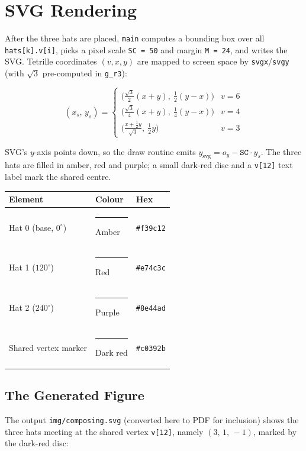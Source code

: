 \documentclass[10pt,a4paper]{article}
\let\polysection\section
\renewcommand\section{\needspace{0.16\textheight}\polysection}
\let\polysubsection\subsection
\renewcommand\subsection{\needspace{0.12\textheight}\polysubsection}
\newcommand{\code}[1]{\texttt{\small #1}}
\newcommand{\file}[1]{\texttt{\footnotesize #1}}
\newcommand{\vcoord}[3]{$(#1,\,#2,\,#3)$}
\begin{document}
\section{SVG Rendering}

After the three hats are placed, \code{main} computes a bounding box over all
\code{hats[k].v[i]}, picks a pixel scale \code{SC = 50} and margin
\code{M = 24}, and writes the SVG.  Tetrille coordinates $(v,x,y)$ are mapped
to screen space by \code{svgx}/\code{svgy} (with $\sqrt 3$ pre-computed in
\code{g\_r3}):

\[
  (x_s,\,y_s) =
  \begin{cases}
    \bigl(\tfrac{\sqrt3}{2}(x+y),\ \tfrac12(y-x)\bigr) & v = 6 \\[3pt]
    \bigl(\tfrac{\sqrt3}{4}(x+y),\ \tfrac14(y-x)\bigr) & v = 4 \\[3pt]
    \bigl(\tfrac{x+\frac12 y}{\sqrt3},\ \tfrac12 y\bigr) & v = 3
  \end{cases}
\]

\noindent SVG's $y$-axis points down, so the draw routine emits
$y_{\text{svg}} = o_y - \texttt{SC}\cdot y_s$.  The three hats are filled in
amber, red and purple; a small dark-red disc and a \code{v[12]} text label
mark the shared centre.

\begin{center}
\begin{tabular}{@{}lll@{}}
\toprule
\textbf{Element} & \textbf{Colour} & \textbf{Hex} \\
\midrule
Hat 0 (base, $0^\circ$)   & {\color{seedorange}\rule{1em}{0.8em}} Amber  & \texttt{\#f39c12} \\
Hat 1 ($120^\circ$)       & {\color{seedred}\rule{1em}{0.8em}} Red    & \texttt{\#e74c3c} \\
Hat 2 ($240^\circ$)       & {\color{seedpurple}\rule{1em}{0.8em}} Purple & \texttt{\#8e44ad} \\
Shared vertex marker      & {\color{centerred}\rule{1em}{0.8em}} Dark red & \texttt{\#c0392b} \\
\bottomrule
\end{tabular}
\end{center}

\subsection{The Generated Figure}

\noindent The output \file{img/composing.svg} (converted here to PDF for
inclusion) shows the three hats meeting at the shared vertex
\code{v[12]}, namely \vcoord{3}{1}{-1}, marked by the dark-red disc:
\end{document}
